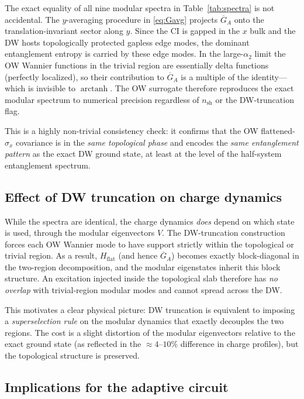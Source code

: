 \documentclass[aps,prb,twocolumn,superscriptaddress,floatfix]{revtex4-2}
\newcommand{\Hflat}{H_{\mathrm{flat}}}
\DeclareMathOperator{\arctanh}{arctanh}
\begin{document}
The exact equality of all nine modular spectra in Table~\ref{tab:spectra}
is not accidental.  The $y$-averaging procedure in \eqref{eq:Gavg} projects
$\overline{G}_A$ onto the translation-invariant sector along $y$.  Since the
CI is gapped in the $x$ bulk and the DW hosts topologically protected gapless
edge modes, the dominant entanglement entropy is carried by these edge modes.
In the large-$\alpha_2$ limit the OW Wannier functions in the trivial region
are essentially delta functions (perfectly localized), so their contribution to
$\overline{G}_A$ is a multiple of the identity—which is invisible to
$\arctanh$.  The OW surrogate therefore reproduces the exact modular spectrum
to numerical precision regardless of $n_\mathrm{sh}$ or the DW-truncation
flag.

This is a highly non-trivial consistency check: it confirms that the OW
flattened-$\sigma_x$ covariance is in the \emph{same topological phase} and
encodes the \emph{same entanglement pattern} as the exact DW ground state,
at least at the level of the half-system entanglement spectrum.

\subsection{Effect of DW truncation on charge dynamics}

While the spectra are identical, the charge dynamics \emph{does} depend on
which state is used, through the modular eigenvectors $V$.  The DW-truncation
construction forces each OW Wannier mode to have support strictly within the
topological or trivial region.  As a result, $\Hflat$ (and hence
$\overline{G}_A$) becomes exactly block-diagonal in the two-region
decomposition, and the modular eigenstates inherit this block structure.
An excitation injected inside the topological slab therefore has \emph{no
overlap} with trivial-region modular modes and cannot spread across the DW.

This motivates a clear physical picture: DW truncation is equivalent to
imposing a \emph{superselection rule} on the modular dynamics that exactly
decouples the two regions.  The cost is a slight distortion of the modular
eigenvectors relative to the exact ground state (as reflected in the
$\approx 4$--$10\%$ difference in charge profiles), but the topological
structure is preserved.

\subsection{Implications for the adaptive circuit}
\end{document}
